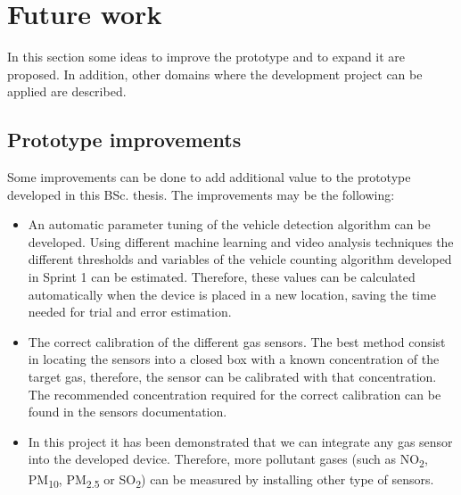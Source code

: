 \section{Future work}
In this section some ideas to improve the prototype and to expand it are proposed. In addition, other domains where the development project can be applied are described.

\subsection{Prototype improvements}
Some improvements can be done to add additional value to the prototype developed in this \ac{BSc.} thesis. The improvements may be the following:
\begin{itemize}
	\item An automatic parameter tuning of the vehicle detection algorithm can be developed. Using different machine learning and video analysis techniques the different thresholds and variables of the vehicle counting algorithm developed in Sprint 1 can be estimated. Therefore, these values can be calculated automatically when the device is placed in a new location, saving the time needed for trial and error estimation. 
	
	\item The correct calibration of the different gas sensors. The best method consist in locating the sensors into a closed box with a known concentration of the target gas, therefore, the sensor can be calibrated with that concentration. The recommended concentration required for the correct calibration can be found in the sensors documentation. 
	
	\item In this project it has been demonstrated that we can integrate any gas sensor into the developed device. Therefore, more pollutant gases (such as NO\textsubscript{2}, PM\textsubscript{10}, PM\textsubscript{2.5} or  SO\textsubscript{2}) can be measured by installing other type of sensors.
	
\end{itemize}


